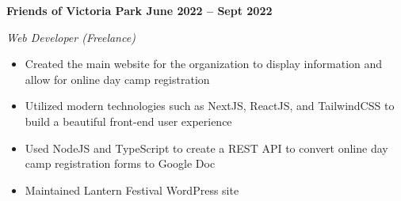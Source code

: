 \vspace{0.1cm}
\textbf{Friends of Victoria Park \hfill June 2022 -- Sept 2022} \par
\textit{Web Developer (Freelance)} \par
\begin{itemize}
    \item Created the main website for the organization to display information and allow for online day camp registration
    \item Utilized modern technologies such as NextJS, ReactJS, and TailwindCSS to build a beautiful front-end user experience
    \item Used NodeJS and TypeScript to create a REST API to convert online day camp registration forms to Google Doc
    \item Maintained Lantern Festival WordPress site 
\end{itemize} \par